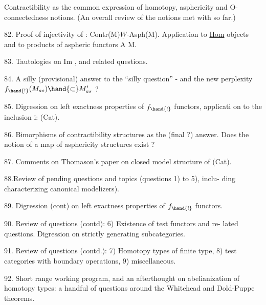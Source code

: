  Contractibility as the common expression of homotopy,  asphericity
and O-connectedness notions. (An overall review of the notions met
with so far.)

82. Proof of injectivity of \hand{$\alpha$}: Contr(M)\hand{$\hookrightarrow$}$\underline{W}$-Asph(M). Application to
\underline{Hom} objects and to products of aspheric functors A\hand{$\longrightarrow$} M.

83. Tautologies on Im \hand{$\alpha$},  and related questions.

84. A silly (provisional) answer to the ``silly question'' - and the new
perplexity  $f_{\hand{!}}(M_{as})\hand{\subset}M'_{as}$  ?

85. Digression on left exactness properties of $f_{\hand{!}}$ functors,  applicati
on to the inclusion i: \hand{$\Delta$}\hand{$\hookrightarrow$}(Cat).

86. Bimorphisms of contractibility structures as the (final ?) answer.
Does the notion of a map of asphericity structures exist ?

87. Comments on Thomason's paper on closed model structure of (Cat).

88.\hand{(}Review of pending questions and topics  (questions 1) to 5), inclu-%
ding characterizing canonical modelizers).

89. Digression (cont) on left exactness properties of $f_{\hand{!}}$ functors.

90. Review of questions (contd): 6) Existence of test functors and re-%
lated questions.  Digression on strictly generating subcategories.

91. Review of questions (contd.): 7) Homotopy types of finite type,
8)  test categories with boundary operations,  9) miscellaneous.

92. Short range working program,  and an afterthought on abelianization
of homotopy types:  a handful of questions around the Whitehead and
Dold-Puppe theorems. 

